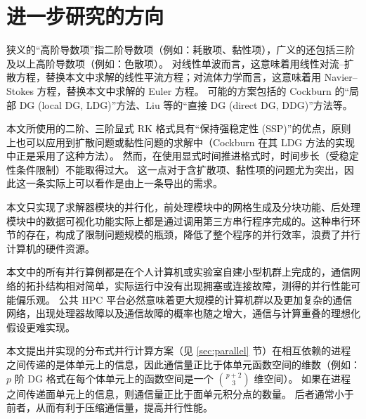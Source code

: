 \section*{进一步研究的方向}
\begin{description}[wide]
\item[增加对高阶导数项的支持。]
狭义的“高阶导数项”指二阶导数项（例如：耗散项、黏性项），广义的还包括三阶及以上高阶导数项（例如：色散项）。
对线性单波而言，这意味着用线性对流–扩散方程，替换本文中求解的线性平流方程；对流体力学而言，这意味着用
Navier–Stokes 方程，替换本文中求解的 Euler 方程。 
可能的方案包括的 Cockburn 的“局部 DG (local DG, LDG)”方法、Liu 等的“直接 DG (direct DG, DDG)”方法等。
\item[提供对隐式时间推进格式的支持。]
本文所使用的二阶、三阶显式 RK 格式具有“保持强稳定性 (SSP)”的优点，原则上也可以应用到扩散问题或黏性问题的求解中（Cockburn 在其 LDG 方法的实现中正是采用了这种方法）。
然而，在使用显式时间推进格式时，时间步长（受稳定性条件限制）不能取得过大。
这一点对于含扩散项、黏性项的问题尤为突出，因此这一条实际上可以看作是由上一条导出的需求。
\item[提高前/后处理模块的并行化程度。]
本文只实现了求解器模块的并行化，前处理模块中的网格生成及分块功能、后处理模块中的数据可视化功能实际上都是通过调用第三方串行程序完成的。这种串行环节的存在，构成了限制问题规模的瓶颈，降低了整个程序的并行效率，浪费了并行计算机的硬件资源。
\item[在公共高性能计算平台上测试并行性能。]
本文中的所有并行算例都是在个人计算机或实验室自建小型机群上完成的，通信网络的拓扑结构相对简单，实际运行中没有出现拥塞或连接故障，测得的并行性能可能偏乐观。
公共 HPC 平台必然意味着更大规模的计算机群以及更加复杂的通信网络，出现处理器故障以及通信故障的概率也随之增大，通信与计算重叠的理想化假设更难实现。
\item[尝试传递面单元（而非体单元）上的信息。]
本文提出并实现的分布式并行计算方案（见 \ref{sec:parallel} 节）在相互依赖的进程之间传递的是体单元上的信息，因此通信量正比于体单元函数空间的维数（例如：$p$ 阶 DG 格式在每个体单元上的函数空间是一个 $\binom{p+2}{3}$ 维空间）。
如果在进程之间传递面单元上的信息，则通信量正比于面单元积分点的数量。
后者通常小于前者，从而有利于压缩通信量，提高并行性能。
\end{description}
